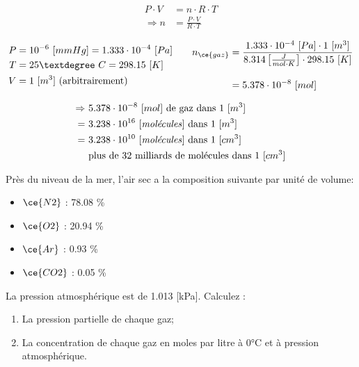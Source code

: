 \documentclass[
  11pt,
  a4paper,
  openany]{book}
\providecommand{\tightlist}{%
  \setlength{\itemsep}{0pt}\setlength{\parskip}{0pt}}
\begin{document}
\begin{Answer}
\[
\begin{split}
    P \cdot V &= n \cdot R \cdot T \\
    \Rightarrow n &= \frac{P \cdot V}{R \cdot T}
\end{split}
\]

\[
\begin{split}
    P &= 10^{-6}\ [mmHg] = 1.333 \cdot 10^{-4}\ [Pa] \\
    T &= 25°\ C = 298.15\ [K] \\
    V &= 1\ [m^3] \text{ (arbitrairement)}
\end{split}
\qquad
\begin{split}
    n_{\ce{gaz}} &= \frac{1.333 \cdot 10^{-4}\ [Pa] \cdot 1\ [m^3]}{8.314 \left[\frac{J}{mol \cdot K}\right] \cdot 298.15\ [K]} \\[1em]
    & = 5.378 \cdot 10^{-8}\ [mol]
\end{split}
\]

\[
\begin{split}
    \Rightarrow\ & 5.378 \cdot 10^{-8}\ [mol] \text{ de gaz dans 1 [$m^3$]} \\
    =\ & 3.238 \cdot 10^{16} \text{ [\textit{molécules}] dans 1 [$m^3$]} \\
    =\ & 3.238 \cdot 10^{10} \text{ [\textit{molécules}] dans 1 [$cm^3$]} \\
    & \text{plus de 32 milliards de molécules dans 1 [$cm^3$]}
\end{split}
\]

\end{Answer}

\begin{Exercise}

Près du niveau de la mer, l'air sec a la composition suivante par unité de volume:

\begin{itemize}
\tightlist
\item
  \(\ce{N2}\) : 78.08 \%
\item
  \(\ce{O2}\) : 20.94 \%
\item
  \(\ce{Ar}\) : 0.93 \%
\item
  \(\ce{CO2}\) : 0.05 \%
\end{itemize}

La pression atmosphérique est de 1.013 {[}kPa{]}. Calculez :

\begin{enumerate}
\def\labelenumi{\alph{enumi}.}
\tightlist
\item
  La pression partielle de chaque gaz;
\item
  La concentration de chaque gaz en moles par litre à 0°C et à pression atmosphérique.
\end{enumerate}

\end{Exercise}
\end{document}

